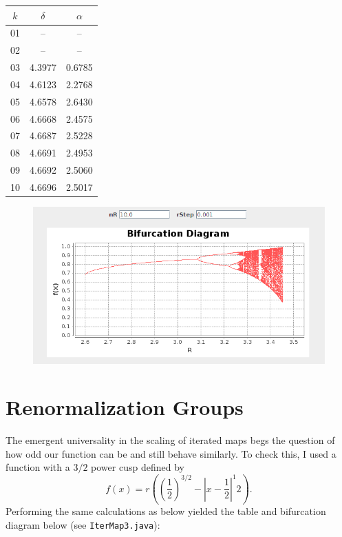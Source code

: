 \documentclass[aps,letterpaper,10pt]{article}
\newcommand{\ttt}{\texttt}
\begin{document}
\begin{center}
\begin{tabular}{|c|c|c|}
\hline
$k$&$\delta$&$\alpha$\\
\hline
01&--&--\\
02&--&--\\
03&4.3977&0.6785\\
04&4.6123&2.2768\\
05&4.6578&2.6430\\
06&4.6668&2.4575\\
07&4.6687&2.5228\\
08&4.6691&2.4953\\
09&4.6692&2.5060\\
10&4.6696&2.5017\\
\hline
\end{tabular}
\begin{figure}[!h]
\centering
\includegraphics[width=.8\textwidth]{IterMap2.png}
\end{figure}
\end{center}


\section{Renormalization Groups}

The emergent universality in the scaling of iterated maps begs the question of how odd our function can be and still behave similarly. To check this, I used a function with a $3/2$ power cusp defined by $$f(x) = r\left( (\frac{1}{2})^{3/2} - |x-\frac{1}{2}|^{1}{2}  \right).$$ Performing the same calculations as below yielded the table and bifurcation diagram below (see \ttt{IterMap3.java}):
\end{document}
